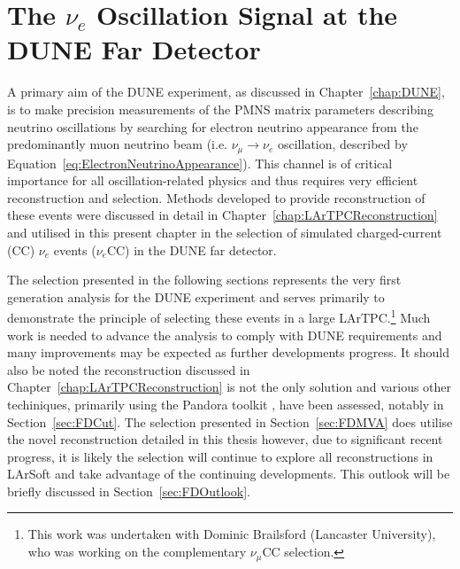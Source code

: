 
\graphicspath{{FarDetectorAnalysis/Figs/}}

\chapter{The $\nu_e$ Oscillation Signal at the DUNE Far Detector}\label{chap:FDAnalysis}

A primary aim of the DUNE experiment, as discussed in Chapter~\ref{chap:DUNE}, is to make precision measurements of the PMNS matrix parameters describing neutrino oscillations by searching for electron neutrino appearance from the predominantly muon neutrino beam (i.e. $\nu_{\mu} \rightarrow \nu_e$ oscillation, described by Equation~\ref{eq:ElectronNeutrinoAppearance}).  This channel is of critical importance for all oscillation-related physics and thus requires very efficient reconstruction and selection.  Methods developed to provide reconstruction of these events were discussed in detail in Chapter~\ref{chap:LArTPCReconstruction} and utilised in this present chapter in the selection of simulated charged-current (CC) $\nu_e$ events ($\nu_e$CC) in the DUNE far detector.

The selection presented in the following sections represents the very first generation analysis for the DUNE experiment and serves primarily to demonstrate the principle of selecting these events in a large LArTPC.\footnote{This work was undertaken with Dominic Brailsford (Lancaster University), who was working on the complementary $\nu_{\mu}$CC selection.}  Much work is needed to advance the analysis to comply with DUNE requirements and many improvements may be expected as further developments progress.  It should also be noted the reconstruction discussed in Chapter~\ref{chap:LArTPCReconstruction} is not the only solution and various other techiniques, primarily using the Pandora toolkit \cite{Pandora2015}, have been assessed, notably in Section~\ref{sec:FDCut}.  The selection presented in Section~\ref{sec:FDMVA} does utilise the novel reconstruction detailed in this thesis however, due to significant recent progress, it is likely the selection will continue to explore all reconstructions in LArSoft and take advantage of the continuing developments.  This outlook will be briefly discussed in Section~\ref{sec:FDOutlook}.

